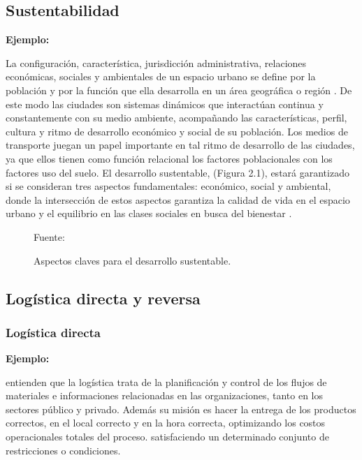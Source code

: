 \subsection{Sustentabilidad}

{\bf Ejemplo:}\par

La configuración, característica, jurisdicción administrativa, relaciones económicas, sociales y ambientales de un espacio urbano se define por la población y por la función que ella desarrolla en un área geográfica o región \citep{Bugliarello}. De este modo las ciudades son sistemas dinámicos que interactúan continua y constantemente con su medio ambiente, acompañando las características, perfil, cultura y ritmo de desarrollo económico y social de su población. Los medios de transporte juegan un papel importante en tal ritmo de desarrollo de las ciudades, ya que ellos tienen como función relacional los factores poblacionales con los factores uso del suelo.  
\vskip 1cm
El desarrollo sustentable, (Figura 2.1), estará garantizado si se consideran tres aspectos fundamentales: económico, social y ambiental, donde la intersección de estos aspectos garantiza la calidad de vida en el espacio urbano y el equilibrio en las clases sociales en busca del bienestar \citep{Tanguay}.

\begin{figure}[ht]
\begin{center}
\end{center}
\begin{center}
\vskip -0.5cm
\caption{\small{Aspectos claves para el desarrollo sustentable.}}
{\small{Fuente: \cite{Tanguay}}}
\end{center}
\end{figure}

\subsection{Logística directa y reversa}

\subsubsection{Logística directa}

{\bf Ejemplo:}\par

\cite{Ghiani} entienden que la logística trata de la planificación y control de los flujos de materiales e informaciones relacionadas en las organizaciones, tanto en los sectores público y privado. Además su misión es hacer la entrega de los productos correctos, en el local correcto y en la hora correcta, optimizando los costos operacionales totales del proceso.
satisfaciendo un determinado conjunto de restricciones o condiciones.\par

